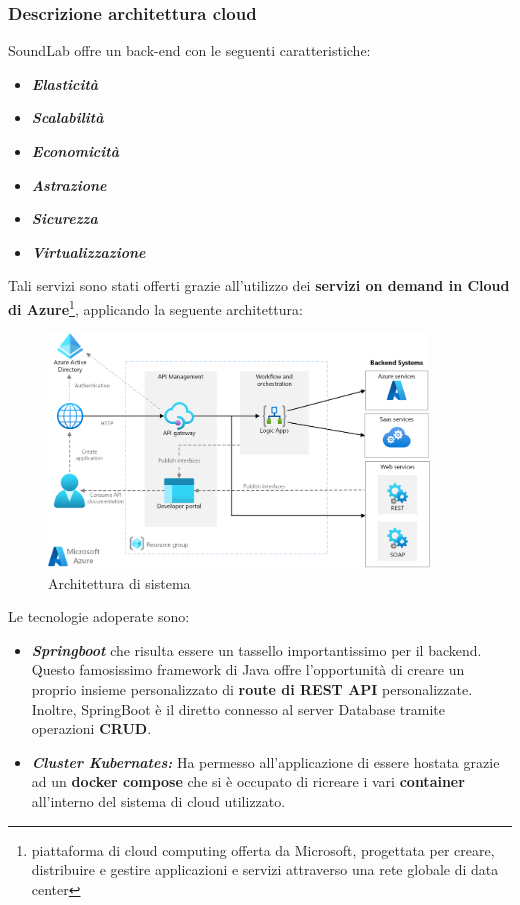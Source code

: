 \documentclass{article}
\begin{document}
		\subsubsection{Descrizione architettura cloud}
		SoundLab offre un back-end con le seguenti caratteristiche:
		\begin{itemize}
			\item \textbf{\textit{\textcolor{dark_purple}{Elasticità}}}
			\item \textbf{\textit{\textcolor{dark_purple}{Scalabilità}}}
			\item \textbf{\textit{\textcolor{dark_purple}{Economicità}}}
			\item \textbf{\textit{\textcolor{dark_purple}{Astrazione}}}
			\item \textbf{\textit{\textcolor{dark_purple}{Sicurezza}}}
			\item \textbf{\textit{\textcolor{dark_purple}{Virtualizzazione}}}
		\end{itemize}
		Tali servizi sono stati offerti grazie all'utilizzo dei \textbf{servizi on demand in Cloud di Azure}\footnote{piattaforma di cloud computing offerta da Microsoft, progettata per creare, distribuire e gestire applicazioni e servizi attraverso una rete globale di data center}, applicando la seguente architettura:
		\begin{figure}[H]
			\centering
			\includegraphics[width=0.9\textwidth]{Immagini/springboot}
			\caption{Architettura di sistema}
		\end{figure}
		Le tecnologie adoperate sono:
		\begin{itemize}
			\item \textbf{\textit{\textcolor{dark_purple}{Springboot}}} che risulta essere un tassello importantissimo per il backend. Questo famosissimo framework di Java offre l'opportunità di creare un proprio insieme personalizzato di \textbf{route di REST API} personalizzate. Inoltre, SpringBoot è il diretto connesso al server Database tramite operazioni \textbf{CRUD}.
			\item \textbf{\textit{\textcolor{dark_purple}{Cluster Kubernates:}}} Ha permesso all'applicazione di essere hostata grazie ad un \textbf{docker compose} che si è occupato di ricreare i vari \textbf{container} all'interno del sistema di cloud utilizzato.
		\end{itemize}
		
\end{document}
